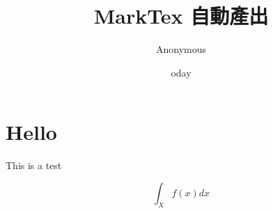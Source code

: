 \documentclass[12pt]{article}
\title{ MarkTex 自動產出 }
\author{ Anonymous }
\date{ 	oday }
\begin{document}
\maketitle

\section{Hello}\label{hello}

This is a test

\[
\int_{X} f(x) dx
\]
\end{document}
